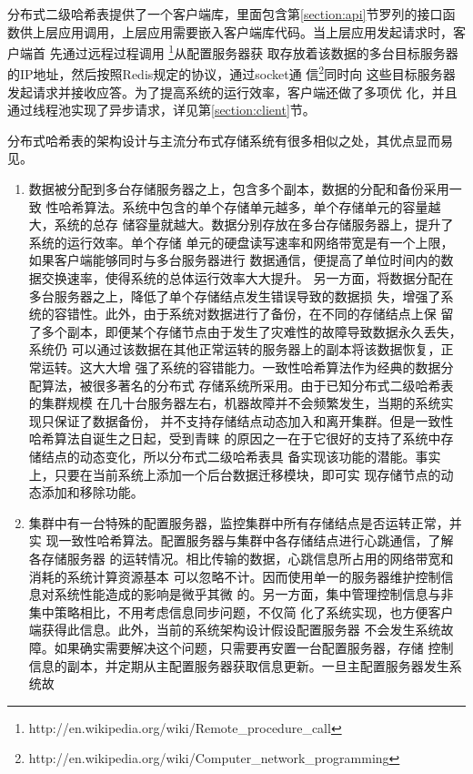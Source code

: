 分布式二级哈希表提供了一个客户端库，里面包含第\ref{section:api}节罗列的接口函
数供上层应用调用，上层应用需要嵌入客户端库代码。当上层应用发起请求时，客户端首
先通过远程过程调用
\footnote{http://en.wikipedia.org/wiki/Remote\_procedure\_call}从配置服务器获
取存放着该数据的多台目标服务器的IP地址，然后按照Redis规定的协议，通过socket通
信\footnote{http://en.wikipedia.org/wiki/Computer\_network\_programming}同时向
这些目标服务器发起请求并接收应答。为了提高系统的运行效率，客户端还做了多项优
化，并且通过线程池实现了异步请求，详见第\ref{section:client}节。

分布式哈希表的架构设计与主流分布式存储系统有很多相似之处，其优点显而易见。
\begin{enumerate}
  \item 数据被分配到多台存储服务器之上，包含多个副本，数据的分配和备份采用一致
  性哈希算法。系统中包含的单个存储单元越多，单个存储单元的容量越大，系统的总存
  储容量就越大。数据分别存放在多台存储服务器上，提升了系统的运行效率。单个存储
  单元的硬盘读写速率和网络带宽是有一个上限，如果客户端能够同时与多台服务器进行
  数据通信，便提高了单位时间内的数据交换速率，使得系统的总体运行效率大大提升。
  另一方面，将数据分配在多台服务器之上，降低了单个存储结点发生错误导致的数据损
  失，增强了系统的容错性。此外，由于系统对数据进行了备份，在不同的存储结点上保
  留了多个副本，即便某个存储节点由于发生了灾难性的故障导致数据永久丢失，系统仍
  可以通过该数据在其他正常运转的服务器上的副本将该数据恢复，正常运转。这大大增
  强了系统的容错能力。一致性哈希算法作为经典的数据分配算法，被很多著名的分布式
  存储系统所采用。\cite{hastorun2007dynamo}由于已知分布式二级哈希表的集群规模
  在几十台服务器左右，机器故障并不会频繁发生，当期的系统实现只保证了数据备份，
  并不支持存储结点动态加入和离开集群。但是一致性哈希算法自诞生之日起，受到青睐
  的原因之一在于它很好的支持了系统中存储结点的动态变化，所以分布式二级哈希表具
  备实现该功能的潜能。事实上，只要在当前系统上添加一个后台数据迁移模块，即可实
  现存储节点的动态添加和移除功能。
  \item 集群中有一台特殊的配置服务器，监控集群中所有存储结点是否运转正常，并实
  现一致性哈希算法。配置服务器与集群中各存储结点进行心跳通信，了解各存储服务器
  的运转情况。相比传输的数据，心跳信息所占用的网络带宽和消耗的系统计算资源基本
  可以忽略不计。因而使用单一的服务器维护控制信息对系统性能造成的影响是微乎其微
  的。另一方面，集中管理控制信息与非集中策略相比，不用考虑信息同步问题，不仅简
  化了系统实现，也方便客户端获得此信息。此外，当前的系统架构设计假设配置服务器
  不会发生系统故障。如果确实需要解决这个问题，只需要再安置一台配置服务器，存储
  控制信息的副本，并定期从主配置服务器获取信息更新。一旦主配置服务器发生系统故

\end{enumerate}
